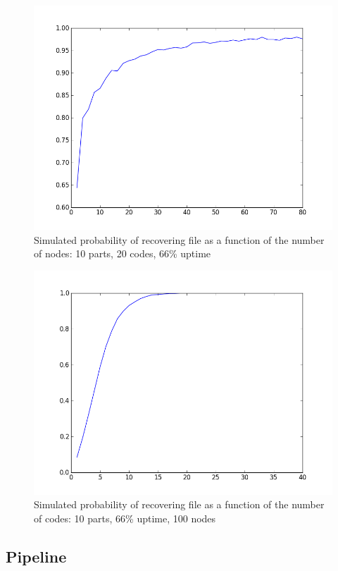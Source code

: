 \documentclass{acm_}
\begin{document}
\begin{figure}
\centering
\includegraphics[scale=0.43]{test.png}
\caption{Simulated probability of recovering file as a function of the number of nodes: 10 parts, 20 codes, 66\% uptime}
\end{figure}
\begin{figure}
\centering
\includegraphics[scale=0.43]{test2.png}
\caption{Simulated probability of recovering file as a function of the number of codes: 10 parts, 66\% uptime, 100 nodes}
\end{figure}

\subsection{Pipeline}
\end{document}
